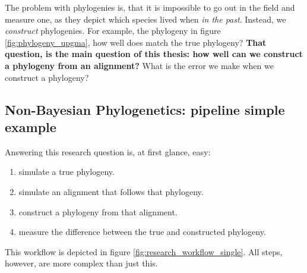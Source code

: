 The problem with phylogenies is, 
that it is impossible to go out in the field and measure one, 
as they depict which species lived when \emph{in the past}.
Instead, we \emph{construct} phylogenies. For example,
the phylogeny in figure \ref{fig:phylogeny_upgma}, how well
does match the true phylogeny? \textbf{That question, is the main question of this 
thesis: how well can we construct a
phylogeny from an alignment?} What is the error we
make when we construct a phylogeny?

\subsection{Non-Bayesian Phylogenetics: pipeline simple example}

Answering this research question is, at first glance, easy: 

\begin{enumerate}[label=\arabic*)]\itemsep2pt
  \item simulate a true phylogeny.
  \item simulate an alignment that follows that phylogeny.
  \item construct a phylogeny from that alignment.
  \item measure the difference between the true and constructed phylogeny.
\end{enumerate}

This workflow is depicted in figure \ref{fig:research_workflow_single}.
All steps, however, are more complex than just this.

